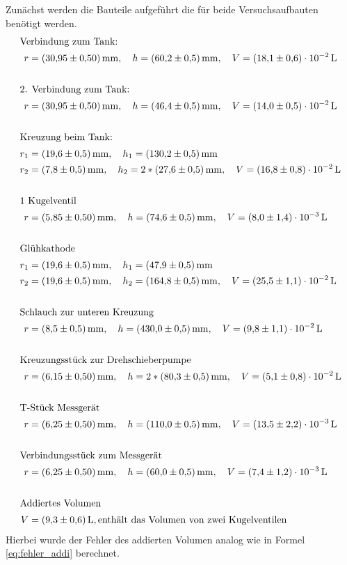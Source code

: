 Zunächst werden die Bauteile aufgeführt die für beide Versuchsaufbauten benötigt werden.
\begin{align*}
  \shortintertext{Verbindung zum Tank:}
  r&=\SI{30.95\pm 0.5}{\milli\meter}, \quad h=\SI{60.2\pm0.5}{\milli\meter}, \quad V=\SI{ 18.1\pm0.6 e-2}{\litre}\\
  \\
  \shortintertext{2. Verbindung zum Tank:}
  r&=\SI{30.95\pm 0.5}{\milli\meter}, \quad h=\SI{46.4\pm0.5}{\milli\meter}, \quad V=\SI{ 14.0\pm0.5 e-2}{\litre}\\
  \\
  \shortintertext{Kreuzung beim Tank:}
  r_1&=\SI{19.6\pm 0.5}{\milli\meter}, \quad h_1=\SI{130.2\pm0.5}{\milli\meter}\\
  r_2&=\SI{7.8\pm 0.5}{\milli\meter}, \quad h_2=2*\SI{27.6\pm0.5}{\milli\meter}, \quad V=\SI{ 16.8\pm0.8 e-2}{\litre}\\
  \\
  \shortintertext{1 Kugelventil}
  r&=\SI{5.85\pm 0.5}{\milli\meter}, \quad h=\SI{74.6\pm0.5}{\milli\meter}, \quad V=\SI{ 8.0\pm1.4 e-3}{\litre}\\
  \\
  \shortintertext{Glühkathode}
  r_1&=\SI{19.6\pm 0.5}{\milli\meter}, \quad h_1=\SI{47.9\pm0.5}{\milli\meter}\\
  r_2&=\SI{19.6\pm 0.5}{\milli\meter}, \quad h_2=\SI{164.8\pm0.5}{\milli\meter}, \quad V=\SI{ 25.5\pm1.1 e-2}{\litre}\\
  \\
  \shortintertext{Schlauch zur unteren Kreuzung}
  r&=\SI{8.5\pm 0.5}{\milli\meter}, \quad h=\SI{430\pm0.5}{\milli\meter}, \quad V=\SI{ 9.8\pm1.1 e-2}{\litre}\\
  \\
  \shortintertext{Kreuzungsstück zur Drehschieberpumpe}
  r&=\SI{6.15\pm 0.5}{\milli\meter}, \quad h=2*\SI{80.3\pm0.5}{\milli\meter}, \quad V=\SI{ 5.1\pm0.8 e-2}{\litre}\\
  \\
  \shortintertext{T-Stück Messgerät}
  r&=\SI{6.25\pm 0.5}{\milli\meter}, \quad h=\SI{110\pm0.5}{\milli\meter}, \quad V=\SI{ 13.5\pm2.2 e-3}{\litre}\\
  \\
  \shortintertext{Verbindungsstück zum Messgerät}
  r&=\SI{6.25\pm 0.5}{\milli\meter}, \quad h=\SI{60\pm0.5}{\milli\meter}, \quad V=\SI{ 7.4\pm1.2 e-3}{\litre}\\
  \\
  \shortintertext{Addiertes Volumen}
  V&=\SI{ 9.3\pm0.6}{\litre}, \text{enthält das Volumen von zwei Kugelventilen}
\end{align*}
Hierbei wurde der Fehler des addierten Volumen analog wie in Formel \ref{eq:fehler_addi} berechnet.

